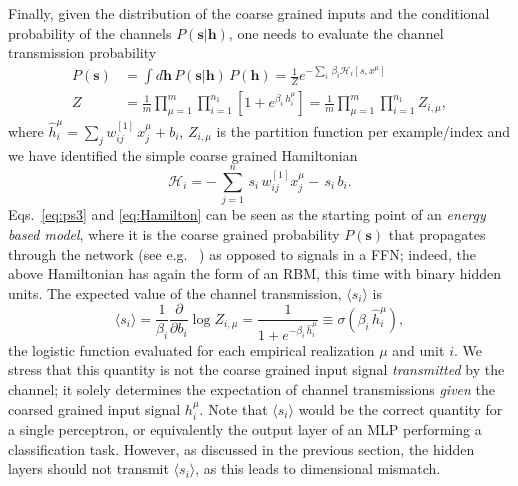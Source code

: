 \documentclass[5p]{elsarticle}
\begin{document}
Finally, given the distribution of the coarse grained inputs and the conditional probability of the channels $P(\mathbf{s}|\mathbf{h})$, one needs to evaluate the channel transmission probability
%
\begin{align} \label{eq:ps3}
P(\mathbf{s}) &= \int d \mathbf{h} \, P(\mathbf{s} | \mathbf{h}) \, P(\mathbf{h}) =  \frac{1}{Z} e^{-\sum_i \, \beta_i \mathscr{H}_i[s, x^{\mu}]}   \\ \nonumber
Z &= \frac{1}{m} \prod_{\mu=1}^m \prod_{i=1}^{n_1} \left[1+ e^{\beta_i \, h^{\mu}_i} \right] =\frac{1}{m} \prod_{\mu=1}^m \prod_{i=1}^{n_1} Z_{i, \mu},
\end{align}
%
where $\hat{h}^{\mu}_i = \sum_{j} w^{[1]}_{ij} \, x^{\mu}_j + b_i $,   $Z_{i, \mu}$ is the partition function per example/index and we have identified the simple coarse grained Hamiltonian
%
\begin{equation} \label{eq:Hamilton}
\mathscr{H}_i = -  \, \sum_{j=1}^n \, s_i \, w^{[1]}_{ij} x^{\mu}_j -  \, s_i \, b_i.
\end{equation}
%
Eqs.~\eqref{eq:ps3} and \eqref{eq:Hamilton} can be seen as the starting point of an {\it energy based model}, where it is the coarse grained probability $P(\mathbf{s})$ that propagates through the network (see e.g.~\cite{connie} ) as opposed to signals in a FFN; indeed, the above Hamiltonian has again the form of an RBM, this time with binary hidden units. The expected value of the channel transmission, $\langle s_i \rangle$ is~\cite{hertz}
%
\begin{equation} \label{eq:ps4}
\langle s_i \rangle = \frac{1}{\beta_i} \frac{\partial}{\partial b_i} \log Z_{i, \mu} =  \frac{1}{1+ e^{-\beta_i \, \hat{h}^{\mu}_i}} \equiv   \sigma(\beta_i \, \hat{h}^{\mu}_i),
\end{equation}
%
 the logistic function evaluated for each empirical realization $\mu$ and unit $i$. We stress that this quantity is not the coarse grained input signal {\it transmitted} by the channel; it solely determines the expectation of channel transmissions {\it given} the coarsed grained input signal $h_i^{\mu}$. Note that $\langle s_i \rangle$ would be the correct quantity for a single perceptron, or equivalently the output layer of an MLP performing a classification task. However, as discussed in the previous section, the hidden layers should not transmit $\langle s_i \rangle$, as this leads to dimensional mismatch.
\end{document}
